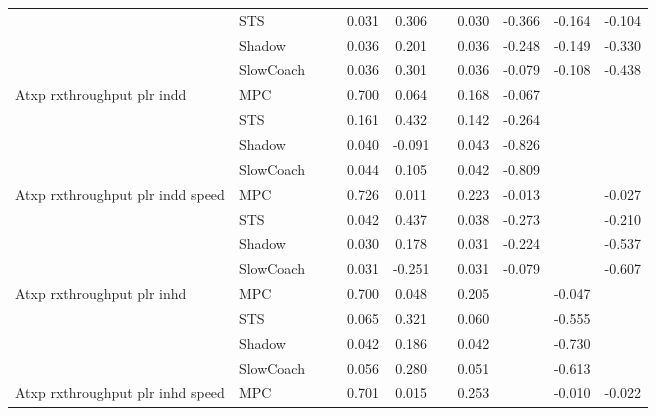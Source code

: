 \begin{tabular}{|l|l|*{9}{c|}}
                              & STS &       &        &     0.031 &  0.306 &     &  0.030 &  -0.366 &  -0.164 &   -0.104 \\
                              & Shadow &       &        &     0.036 &  0.201 &     &  0.036 &  -0.248 &  -0.149 &   -0.330 \\
                              & SlowCoach &       &        &     0.036 &  0.301 &     &  0.036 &  -0.079 &  -0.108 &   -0.438 \\
\midrule
Atxp rxthroughput plr indd    & MPC &       &        &     0.700 &  0.064 &     &  0.168 &  -0.067 &      &       \\
                              & STS &       &        &     0.161 &  0.432 &     &  0.142 &  -0.264 &      &       \\
                              & Shadow &       &        &     0.040 & -0.091 &     &  0.043 &  -0.826 &      &       \\
                              & SlowCoach &       &        &     0.044 &  0.105 &     &  0.042 &  -0.809 &      &       \\
\midrule
Atxp rxthroughput plr indd speed    & MPC &       &        &     0.726 &  0.011 &     &  0.223 &  -0.013 &      &   -0.027 \\
                              & STS &       &        &     0.042 &  0.437 &     &  0.038 &  -0.273 &      &   -0.210 \\
                              & Shadow &       &        &     0.030 &  0.178 &     &  0.031 &  -0.224 &      &   -0.537 \\
                              & SlowCoach &       &        &     0.031 & -0.251 &     &  0.031 &  -0.079 &      &   -0.607 \\
\midrule
Atxp rxthroughput plr inhd    & MPC &       &        &     0.700 &  0.048 &     &  0.205 &      &  -0.047 &       \\
                              & STS &       &        &     0.065 &  0.321 &     &  0.060 &      &  -0.555 &       \\
                              & Shadow &       &        &     0.042 &  0.186 &     &  0.042 &      &  -0.730 &       \\
                              & SlowCoach &       &        &     0.056 &  0.280 &     &  0.051 &      &  -0.613 &       \\
\midrule
Atxp rxthroughput plr inhd speed    & MPC &       &        &     0.701 &  0.015 &     &  0.253 &      &  -0.010 &   -0.022 \\

\end{tabular}
